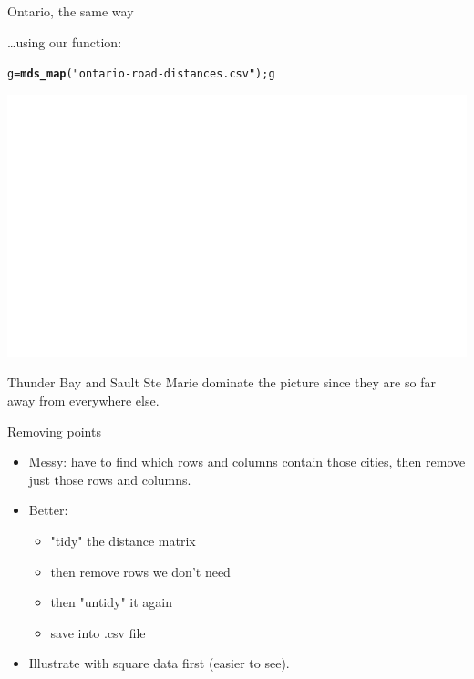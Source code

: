 \documentclass[unknownkeysallowed]{beamer}\usepackage[]{graphicx}\usepackage[]{color}
\makeatletter
\def\maxwidth{ %
  \ifdim\Gin@nat@width>\linewidth
    \linewidth
  \else
    \Gin@nat@width
  \fi
}
\newcommand{\hlstr}[1]{\textcolor[rgb]{0.192,0.494,0.8}{#1}}%
\newcommand{\hlstd}[1]{\textcolor[rgb]{0.345,0.345,0.345}{#1}}%
\newcommand{\hlkwb}[1]{\textcolor[rgb]{0.69,0.353,0.396}{#1}}%
\newcommand{\hlkwd}[1]{\textcolor[rgb]{0.737,0.353,0.396}{\textbf{#1}}}%
\newenvironment{kframe}{%
 \def\at@end@of@kframe{}%
 \ifinner\ifhmode%
  \def\at@end@of@kframe{\end{minipage}}%
  \begin{minipage}{\columnwidth}%
 \fi\fi%
 \def\FrameCommand##1{\hskip\@totalleftmargin \hskip-\fboxsep
 \colorbox{shadecolor}{##1}\hskip-\fboxsep
     \hskip-\linewidth \hskip-\@totalleftmargin \hskip\columnwidth}%
 \MakeFramed {\advance\hsize-\width
   \@totalleftmargin\z@ \linewidth\hsize
   \@setminipage}}%
 {\par\unskip\endMakeFramed%
 \at@end@of@kframe}
\newenvironment{knitrout}{}{} %
\makeatother
\begin{document}
\begin{frame}[fragile]{Ontario, the same way}

  \ldots using our function:

\begin{knitrout}
\color{fgcolor}\begin{kframe}
\begin{alltt}
\hlstd{g}\hlkwb{=}\hlkwd{mds_map}\hlstd{(}\hlstr{"ontario-road-distances.csv"}\hlstd{) ; g}
\end{alltt}
\end{kframe}
\includegraphics[width=\maxwidth]{figure/unnamed-chunk-400-1} 

\end{knitrout}

Thunder Bay and Sault Ste Marie dominate the picture since they are
so far away from everywhere else.

% 
  
\end{frame}


\begin{frame}[fragile]{Removing points}
  
  \begin{itemize}
  \item Messy: have to find which rows and columns contain
    those cities, then remove just those rows and columns.
  \item Better: 
    \begin{itemize}
    \item "tidy" the distance matrix
    \item then remove rows we don't need
    \item then "untidy" it again
    \item save into .csv file
    \end{itemize}

  \item Illustrate with square data first (easier to see).
    
  \end{itemize}
  
\end{frame}
\end{document}
